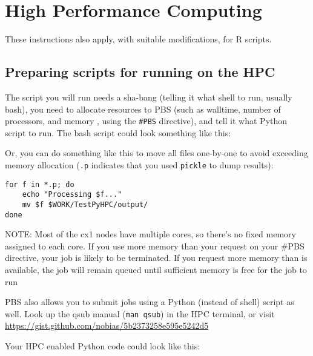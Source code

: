 \chapter{High Performance Computing}
\label{chap:HPC}

These instructions also apply, with suitable modifications, for R 
scripts.

\section{Preparing scripts for running on the HPC}

The script you will run needs a sha-bang (telling it what shell to run, 
usually bash), you need to allocate resources to PBS (such as walltime, 
number of processors, and memory , using the {\tt \#PBS} directive), and tell it what Python script to run. The bash script could look something like this:



Or, you can do something like this to move all files one-by-one to 
avoid exceeding memory allocation ({\tt *.p} indicates that you used 
{\tt pickle} to dump results):

\begin{lstlisting}
for f in *.p; do
	echo "Processing $f..."
	mv $f $WORK/TestPyHPC/output/
done
\end{lstlisting}

NOTE: Most of the cx1 nodes have multiple cores, so there's no fixed memory assigned to each core. If you use more memory than your request on your \#PBS directive, your job is likely to be terminated. If you request more memory than is available, the job will remain queued until sufficient memory is free 
for the job to run

PBS also  allows  you  to  submit jobs using a Python (instead of 
shell) script as well. Look up the qsub manual ({\tt man qsub}) in the 
HPC terminal, or visit 
\url{https://gist.github.com/nobias/5b2373258e595e5242d5}

Your HPC enabled Python code could look like this:






